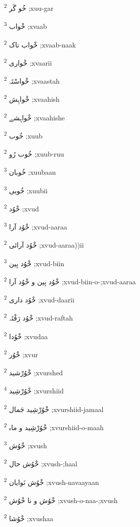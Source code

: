 \documentclass[12pt]{article}
\begin{document}
\begin{multicols}{5}
{\ur خُو گَر}   \textsuperscript{2} ;xuu-gar

{\ur خْواب}   \textsuperscript{3} ;xvaab

{\ur خْواب ناک}   \textsuperscript{2} ;xvaab-naak

{\ur خْواری}   \textsuperscript{2} ;xvaarii

{\ur خْواسْتَہ}   \textsuperscript{2} ;xvaastah

{\ur خْواہِش}   \textsuperscript{2} ;xvaahish

{\ur خْواہِشے}   \textsuperscript{2} ;xvaahishe

{\ur خُوب}   \textsuperscript{2} ;xuub

{\ur خُوب رُو}   \textsuperscript{2} ;xuub-ruu

{\ur خُوبان}   \textsuperscript{3} ;xuubaan

{\ur خُوبی}   \textsuperscript{3} ;xuubii

{\ur خْوُد}   \textsuperscript{2} ;xvud

{\ur خْوُد آرا}   \textsuperscript{3} ;xvud-aaraa

{\ur خْوُد آرائی}   \textsuperscript{2} ;xvud-aaraa))ii

{\ur خْوُد بِین}   \textsuperscript{3} ;xvud-biin

{\ur خْوُد بِین و خْوُد آرا}   \textsuperscript{2} ;xvud-biin-o-;xvud-aaraa

{\ur خْوُد داری}   \textsuperscript{2} ;xvud-daarii

{\ur خْوُد رَفْتَہ}   \textsuperscript{2} ;xvud-raftah

{\ur خْوُدا}   \textsuperscript{2} ;xvudaa

{\ur خْوُر}   \textsuperscript{2} ;xvur

{\ur خْوُرْشید}   \textsuperscript{2} ;xvurshed

{\ur خْوُرْشِید}   \textsuperscript{4} ;xvurshiid

{\ur خْوُرْشِید جَمال}   \textsuperscript{2} ;xvurshiid-jamaal

{\ur خْوُرْشِید و ماہ}   \textsuperscript{2} ;xvurshiid-o-maah

{\ur خْوُش}   \textsuperscript{3} ;xvush

{\ur خْوُش حال}   \textsuperscript{2} ;xvush-;haal

{\ur خْوُش نَوایان}   \textsuperscript{2} ;xvush-navaayaan

{\ur خْوُش و نا خْوُش}   \textsuperscript{2} ;xvush-o-naa-;xvush

{\ur خْوُشا}   \textsuperscript{2} ;xvushaa


\end{multicols}
\end{document}
